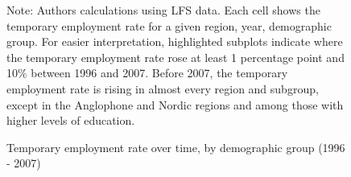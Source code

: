 \documentclass[12pt]{article}
\begin{document}
\begin{figure}
    \caption{Temporary employment rate over time, by demographic group (1996 - 2007)}
    \label{graph_eu_lfs_pct_combo_1}
    \footnotesize{Note: Authors calculations using LFS data.  Each cell shows the temporary employment rate for a given region, year, demographic group.  For easier interpretation, highlighted subplots indicate where the temporary employment rate rose at least 1 percentage point and 10\% between 1996 and 2007.  Before 2007, the temporary employment rate is rising in almost every region and subgroup, except in the Anglophone and Nordic regions and among those with higher levels of education.}
\end{figure}
\end{document}
